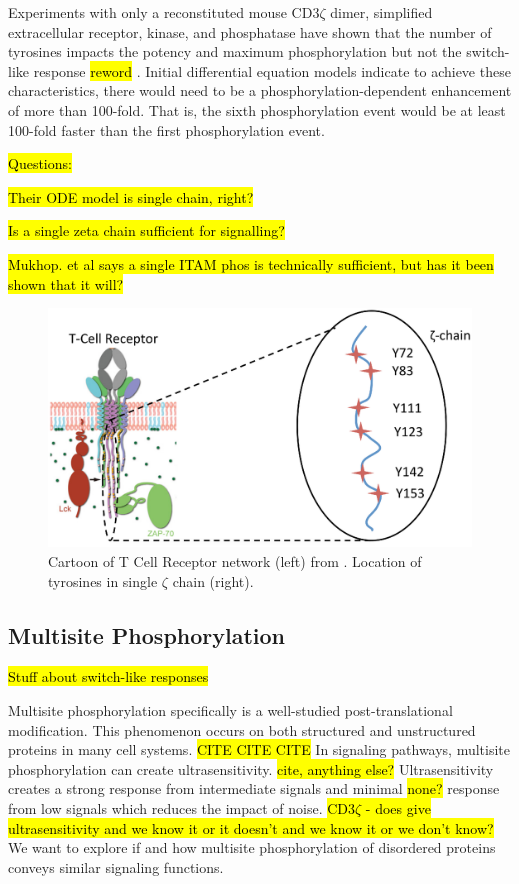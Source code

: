\documentclass[../AdvancementSummary.tex]{subfiles}
\begin{document}
Experiments with only a reconstituted mouse CD3$\zeta$ dimer, simplified extracellular receptor, kinase, and phosphatase have shown that the number of tyrosines impacts the potency and maximum phosphorylation but not the switch-like response \hl{reword} \cite{Mukhopadhyay2016}. Initial differential equation models indicate to achieve these characteristics, there would need to be a phosphorylation-dependent enhancement of more than 100-fold. That is, the sixth phosphorylation event would be at least 100-fold faster than the first phosphorylation event. \cite{Mukhopadhyay2016} 

\hl{Questions:}

\hl{Their ODE model is single chain, right?}

\hl{Is a single zeta chain sufficient for signalling?} 

\hl{Mukhop. et al says a single ITAM phos is technically sufficient, but has it been shown that it will?}

\begin{figure}
	\begin{center}
		\includegraphics[width=0.8\linewidth]{Figures/TCRDiagram.eps}
	\end{center}
\caption{Cartoon of T Cell Receptor network (left) from \cite{Wu2015}. Location of tyrosines in single $\zeta$ chain (right). \label{fig: TCRCartoon}}
\end{figure}


\subsection{Multisite Phosphorylation}

\hl{Stuff about switch-like responses}

Multisite phosphorylation specifically is a well-studied post-translational modification.  This phenomenon occurs on both structured and unstructured proteins in many cell systems. \hl{CITE CITE CITE} In signaling pathways, multisite phosphorylation can create ultrasensitivity. \hl{cite, anything else?} Ultrasensitivity creates a strong response from intermediate signals and minimal \hl{none?} response from low signals which reduces the impact of noise. \hl{CD3$\zeta$ - does give ultrasensitivity and we know it or it doesn't and we know it or we don't know?} We want to explore if and how multisite phosphorylation of disordered proteins conveys similar signaling functions.
\end{document}
